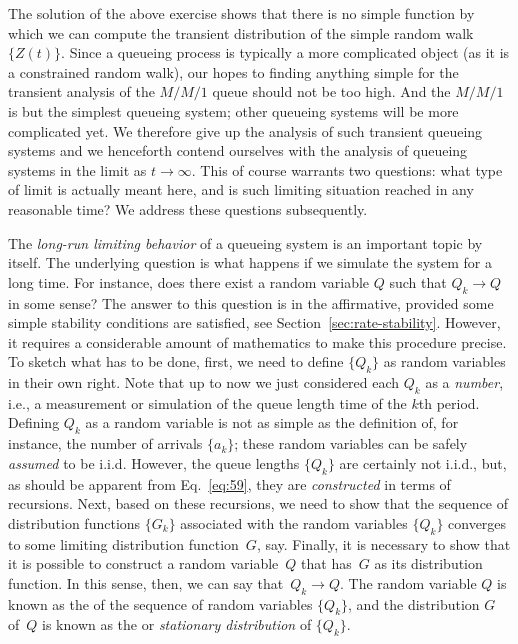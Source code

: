 The solution of the above exercise shows that there is no simple
function by which we can compute the transient distribution of 
the  simple random walk $\{Z(t)\}$. Since a queueing process is typically a
more complicated object (as it is a constrained random walk), our
hopes to finding anything simple for the transient analysis of the
$M/M/1$ queue should not be too high. And the $M/M/1$ is but the
simplest queueing system; other queueing systems will be more
complicated yet.  We therefore give up the analysis of such transient
queueing systems and we henceforth contend ourselves with the analysis
of queueing systems in the limit as $t\to\infty$.  This of course
warrants two questions: what type of limit is actually meant here, and
is such limiting situation reached in any reasonable time? We address
these questions subsequently.

The \emph{long-run limiting behavior} of a queueing system is an
important topic by itself. The underlying question is what happens if
we simulate the system for a long time. For instance, does there exist
a random variable $Q$ such that $Q_k\to Q$ in some sense? The answer
to this question is in the affirmative, provided some simple stability
conditions are satisfied, see
Section~\ref{sec:rate-stability}. However, it requires a considerable
amount of mathematics to make this procedure precise. To sketch what
has to be done, first, we need to define $\{Q_k\}$ as random variables
in their own right. Note that up to now we just considered each $Q_k$
as a \emph{number}, i.e., a measurement or simulation of the queue
length time of the $k$th period. Defining $Q_k$ as a random variable
is not as simple as the definition of, for instance, the number of
arrivals $\{a_k\}$; these random variables can be safely
\emph{assumed} to be i.i.d. However, the queue lengths $\{Q_k\}$ are
certainly not i.i.d., but, as should be apparent from
Eq.~\eqref{eq:59}, they are \emph{constructed} in terms of
recursions. Next, based on these recursions, we need to show that the
sequence of distribution functions $\{G_k\}$ associated with the
random variables $\{Q_k\}$ converges to some limiting distribution
function~$G$, say. Finally, it is necessary to show that it is
possible to construct a random variable~$Q$ that has~$G$ as its
distribution function.  In this sense, then, we can say
that~$Q_k \to Q$. The random variable $Q$ is known as the
 of the sequence of random variables
$\{Q_k\}$, and the distribution $G$ of~$Q$ is known as the
 or \emph{stationary distribution} of $\{Q_k\}$.

